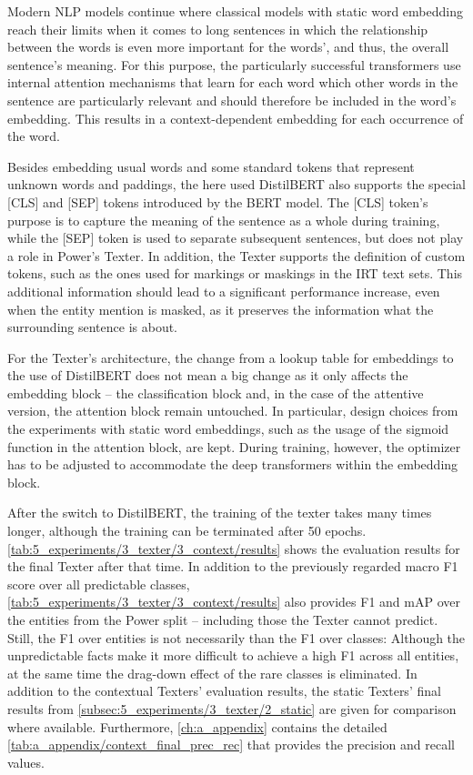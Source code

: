 Modern NLP models continue where classical models with static word embedding reach their limits when it comes to long sentences in which the relationship between the words is even more important for the words', and thus, the overall sentence's meaning. For this purpose, the particularly successful transformers use internal attention mechanisms that learn for each word which other words in the sentence are particularly relevant and should therefore be included in the word's embedding. This results in a context-dependent embedding for each occurrence of the word.

Besides embedding usual words and some standard tokens that represent unknown words and paddings, the here used DistilBERT also supports the special [CLS] and [SEP] tokens introduced by the BERT model. The [CLS] token's purpose is to capture the meaning of the sentence as a whole during training, while the [SEP] token is used to separate subsequent sentences, but does not play a role in Power's Texter. In addition, the Texter supports the definition of custom tokens, such as the ones used for markings or maskings in the IRT text sets. This additional information should lead to a significant performance increase, even when the entity mention is masked, as it preserves the information what the surrounding sentence is about.

For the Texter's architecture, the change from a lookup table for embeddings to the use of DistilBERT does not mean a big change as it only affects the embedding block -- the classification block and, in the case of the attentive version, the attention block remain untouched. In particular, design choices from the experiments with static word embeddings, such as the usage of the sigmoid function in the attention block, are kept. During training, however, the optimizer has to be adjusted to accommodate the deep transformers within the embedding block.

After the switch to DistilBERT, the training of the texter takes many times longer, although the training can be terminated after 50 epochs. \autoref{tab:5_experiments/3_texter/3_context/results} shows the evaluation results for the final Texter after that time. In addition to the previously regarded macro F1 score over all predictable classes, \autoref{tab:5_experiments/3_texter/3_context/results} also provides F1 and mAP over the entities from the Power split -- including those the Texter cannot predict. Still, the F1 over entities is not necessarily than the F1 over classes: Although the unpredictable facts make it more difficult to achieve a high F1 across all entities, at the same time the drag-down effect of the rare classes is eliminated. In addition to the contextual Texters' evaluation results, the static Texters' final results from \autoref{subsec:5_experiments/3_texter/2_static} are given for comparison where available. Furthermore, \autoref{ch:a_appendix} contains the detailed \autoref{tab:a_appendix/context_final_prec_rec} that provides the precision and recall values.

